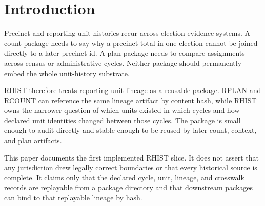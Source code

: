 \section{Introduction}

Precinct and reporting-unit histories recur across election evidence systems.
A count package needs to say why a precinct total in one election cannot be
joined directly to a later precinct id. A plan package needs to compare
assignments across census or administrative cycles. Neither package should
permanently embed the whole unit-history substrate.

RHIST therefore treats reporting-unit lineage as a reusable package. RPLAN and
RCOUNT can reference the same lineage artifact by content hash, while RHIST
owns the narrower question of which units existed in which cycles and how
declared unit identities changed between those cycles. The package is small
enough to audit directly and stable enough to be reused by later count,
context, and plan artifacts.

This paper documents the first implemented RHIST slice. It does not assert
that any jurisdiction drew legally correct boundaries or that every historical
source is complete. It claims only that the declared cycle, unit, lineage, and
crosswalk records are replayable from a package directory and that downstream
packages can bind to that replayable lineage by hash.
